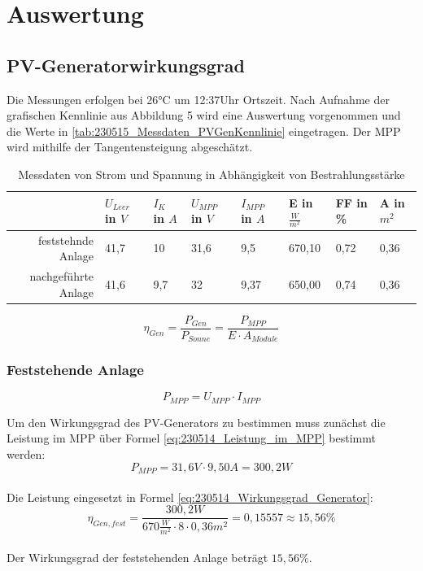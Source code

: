 \newpage
\section{Auswertung}
\subsection{PV-Generatorwirkungsgrad}
Die Messungen erfolgen bei 26°C um 12:37Uhr Ortszeit.
Nach Aufnahme der grafischen Kennlinie aus Abbildung 5 wird eine Auswertung vorgenommen und die Werte in  \autoref{tab:230515_Messdaten_PVGenKennlinie} eingetragen. 
Der MPP wird mithilfe der Tangentensteigung abgeschätzt.
 
\begin{table}[!ht]
\centering
\caption{Messdaten von Strom und Spannung in Abhängigkeit von Bestrahlungsstärke}
\label{tab:230515_Messdaten_PVGenKennlinie}
\begin{tabularx}{\textwidth}{|r|X|X|X|X|X|X|X|}
\hline
\rowcolor[HTML]{76B900} 
                                            & $U_{Leer}$ in $V$ & $I_K$ in $A$ & $U_{MPP}$ in $V$ & $I_{MPP}$ in $A$ & E in $\frac{W}{m^2}$ & FF in \% & A in $m^2$ \\ \hline
\cellcolor[HTML]{cfe5a8}feststehnde Anlage  & 41,7              & 10           & 31,6             & 9,5            & 670,10                      & 0,72     & 0,36    \\ \hline
\cellcolor[HTML]{cfe5a8}nachgeführte Anlage & 41,6              & 9,7          & 32               & 9,37           & 650,00                      & 0,74     & 0,36     \\ \hline
\end{tabularx}
\end{table}

\begin{equation}
\eta_{Gen}=\frac{P_{Gen}}{P_{Sonne}}=\frac{P_{MPP}}{E\cdot A_{Module}}
\label{eq:230514_Wirkungsgrad_Generator}
\end{equation}

\subsubsection{Feststehende Anlage}
\begin{equation}
P_{MPP} = U_{MPP} \cdot I_{MPP}
\label{eq:230514_Leistung_im_MPP}
\end{equation}

Um den Wirkungsgrad des PV-Generators zu bestimmen muss zunächst die Leistung im MPP über Formel \autoref{eq:230514_Leistung_im_MPP} bestimmt werden:
\\
$$P_{MPP} = 31,6V \cdot 9,50A = 300,2W$$ 
\\
Die Leistung eingesetzt in Formel \autoref{eq:230514_Wirkungsgrad_Generator}:\\
$$\eta_{Gen,fest}=\frac{300,2W}{670\frac{W}{m^2}\cdot 8\cdot0,36 m^2}
=0,15557 \approx 15,56\%$$\\
Der Wirkungsgrad der feststehenden Anlage beträgt $15,56\%$.
